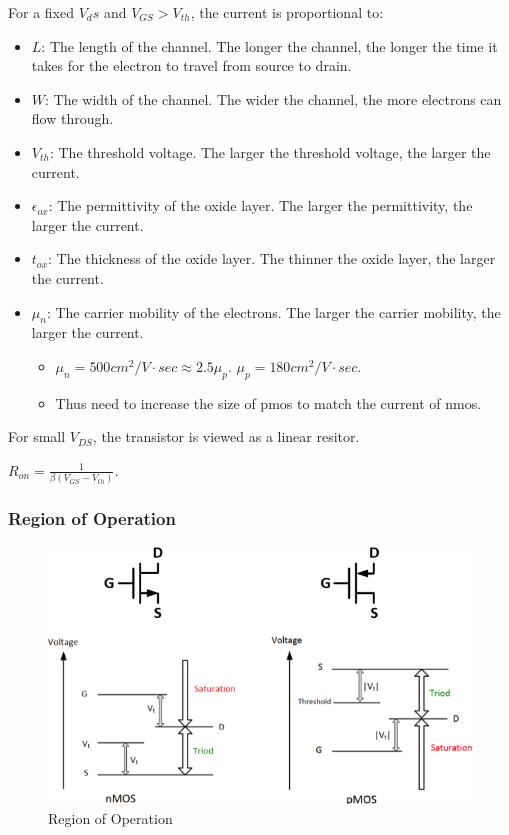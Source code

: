 For a fixed $V_ds$ and $V_{GS} > V_{th}$, the current is proportional to:\begin{itemize}
    \item $L$: The length of the channel. The longer the channel, the longer the time it takes for the electron to travel from source to drain.
    \item $W$: The width of the channel. The wider the channel, the more electrons can flow through.
    \item $V_{th}$: The threshold voltage. The larger the threshold voltage, the larger the current.
    \item $\epsilon_{ox}$: The permittivity of the oxide layer. The larger the permittivity, the larger the current.
    \item $t_{ox}$: The thickness of the oxide layer. The thinner the oxide layer, the larger the current.
    \item $\mu_n$: The carrier mobility of the electrons. The larger the carrier mobility, the larger the current.\begin{itemize}
        \item $\mu_n = 500cm^2/V \cdot sec \approx 2.5 \mu_p$. $\mu_p = 180cm^2/V \cdot sec$.
        \item Thus need to increase the size of pmos to match the current of nmos.
    \end{itemize}
\end{itemize}

For small $V_{DS}$, the transistor is viewed as a linear resitor. 

$R_{on} = \frac{1}{\beta (V_{GS} - V_{th})}$.

\subsubsection{Region of Operation}

\begin{figure}[h]
    \centering
    \includegraphics[scale=1]{images/MOS_relative_voltage.png}
    \caption{Region of Operation}
\end{figure}